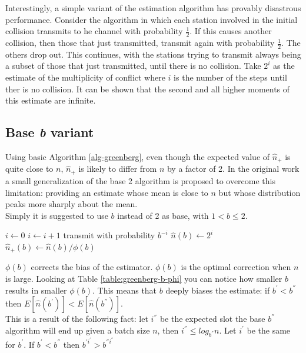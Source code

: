 \documentclass[11pt,a4paper,twoside,openright]{book}
\newcommand{\algname}[1]{\ensuremath{\mbox{\sc #1}}}
\begin{document}
Interestingly, a simple variant of the estimation algorithm has provably disastrous performance. Consider the algorithm in which each station involved in the initial collision transmits to he channel with probability $\frac{1}{2}$. If this causes another collision, then those that just transmitted, transmit again with probability $\frac{1}{2}$. The others drop out. This continues, with the stations trying to transmit always being a subset of those that just transmitted, until there is no collision. Take $2^{i}$ as the estimate of the multiplicity of conflict where $i$ is the number of the steps until ther is no collision. It can be shown that the second and all higher moments of this estimate are infinite.

\subsection{Base \emph{b} variant}

Using basic Algorithm \ref{alg-greenberg}, even though the expected value of $\hat{n}_{+}$ is quite close to $n$, $\hat{n}_{+}$ is likely to differ from $n$ by a factor of 2. In the original work a small generalization of the base 2 algorithm is proposed to overcome this limitation: providing an estimate whose mean is  close to $n$ but whose  distribution peaks more sharply about the mean.\\
Simply it is suggested to use $b$ instead of 2 as base, with $1<b\leq2$.\\
\begin{algorithm}[H]
\begin{algorithmic}
\STATE $i\gets 0$
\REPEAT
	\STATE $i\gets i+1$
	\STATE transmit with probability $b^{-i}$
\STATE $\hat{n}(b) \gets 2^{i}$
\STATE $\hat{n}_{+}(b) \gets \hat{n}(b)/\phi(b)$
\end{algorithmic}
\caption{\algname{base \emph{b} Greenberg ($\mathcal{B}$)}}
\label{alg-greenberg-base-b}
\end{algorithm}

$\phi(b)$ corrects the bias of the estimator. $\phi(b)$ is the optimal correction when $n$ is large.
Looking at Table \ref{table:greenberg-b-phi} you can notice how smaller $b$ results in smaller $\phi(b)$. This means that $b$ deeply biases the estimate: if $b^{'} < b^{''}$ then $E[\hat{n}(b^{'})] < E[\hat{n}(b^{''})]$.\\ This is a result of the following fact: let $i^{''}$ be the expected slot the base $b^{''}$ algorithm will end up given a batch size $n$, then $i^{''} \leq log_{b^{''}} n$. Let $i^{'}$ be the same for $b^{'}$. If $b^{'} < b^{''}$ then $b^{'i^{'}} > b^{''i^{''}}$ 
\end{document}
